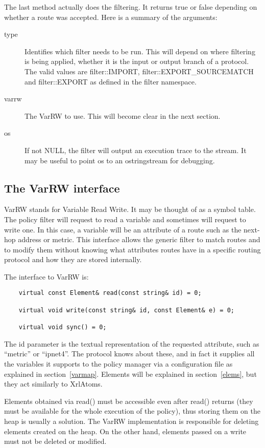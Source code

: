 \documentclass{article}
\begin{document}
The last method actually does the filtering. It returns true or false depending
on whether a route was accepted. Here is a summary of the arguments:
\begin{description}
\item[type] Identifies which filter needs to be run. This will depend on where
filtering is being applied, whether it is the input or output branch of a
protocol. The valid values are filter::IMPORT, filter::EXPORT\_SOURCEMATCH and
filter::EXPORT as defined in the filter namespace.

\item[varrw] The VarRW to use. This will become clear in the next section.
\item[os] If not NULL, the filter will output an execution trace to the stream.
It may be useful to point os to an ostringstream for debugging.
\end{description}

\subsection{The VarRW interface}
VarRW stands for Variable Read Write. It may be thought of as a symbol table. The
policy filter will request to read a variable and sometimes will request to
write one. In this case, a variable will be an attribute of a route such as the
next-hop address or metric. This interface allows the generic filter to match
routes and to modify them without knowing what attributes routes have in a
specific routing protocol and how they are stored internally.

The interface to VarRW is:
\begin{verbatim}
    virtual const Element& read(const string& id) = 0;
    
    virtual void write(const string& id, const Element& e) = 0;

    virtual void sync() = 0;
\end{verbatim}
The id parameter is the textual representation of the requested attribute, such
as ``metric'' or ``ipnet4''. The protocol knows about these, and in fact it
supplies all the variables it supports to the policy manager via a configuration
file as explained in section~\ref{varmap}. Elements will be explained in
section~\ref{elems}, but
they act similarly
to XrlAtoms. 

Elements obtained via read() must be accessible even after read() returns (they
must be available for the whole execution of the policy), thus storing them on
the heap is usually a solution. The VarRW implementation is responsible for
deleting elements created on the heap. On the other hand, elements passed on a
write must not be deleted or modified.
\end{document}
